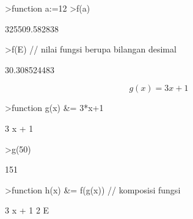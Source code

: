 \documentclass[a4paper,10pt]{article}
\begin{document}
\begin{eulernotebook}
\begin{eulercomment}
\begin{eulercomment}
\begin{eulerprompt}
>function a:=12
>f(a)
\end{eulerprompt}
\begin{euleroutput}
  325509.582838
\end{euleroutput}
\begin{eulerprompt}
>f(E) // nilai fungsi berupa bilangan desimal
\end{eulerprompt}
\begin{euleroutput}
  30.308524483
\end{euleroutput}
\begin{eulerformula}
\[
g(x)=3x+1
\]
\end{eulerformula}
\begin{eulerprompt}
>function g(x) &= 3*x+1
\end{eulerprompt}
\begin{euleroutput}
  
                                 3 x + 1
  
\end{euleroutput}
\begin{eulerprompt}
>g(50)
\end{eulerprompt}
\begin{euleroutput}
  151
\end{euleroutput}
\begin{eulerprompt}
>function h(x) &= f(g(x)) // komposisi fungsi
\end{eulerprompt}
\begin{euleroutput}
  
                                   3 x + 1
                                2 E
  

\end{euleroutput}
\end{eulercomment}
\end{eulercomment}
\end{eulernotebook}
\end{document}
